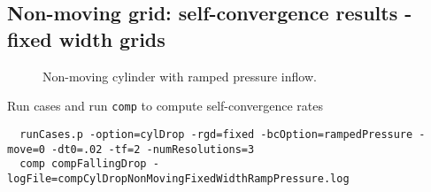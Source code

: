 \documentclass[11pt]{article}
\begin{document}
\subsection{Non-moving grid: self-convergence results - fixed width grids}

{
\begin{figure}[hbt]
\newcommand{\figWidth}{6.25cm}
\newcommand{\trimfig}[2]{\trimh{#1}{#2}{0.2}{.0}{.0}{.0}}
\begin{center}\small
\caption{
Non-moving cylinder with ramped pressure inflow.
}
\label{fig:cylDropNonMovingRampedPressure}
\end{center}
\end{figure}
}

Run cases and run {\tt comp} to compute self-convergence rates
\begin{lstlisting}
  runCases.p -option=cylDrop -rgd=fixed -bcOption=rampedPressure -move=0 -dt0=.02 -tf=2 -numResolutions=3
  comp compFallingDrop -logFile=compCylDropNonMovingFixedWidthRampPressure.log
\end{lstlisting}
\end{document}
